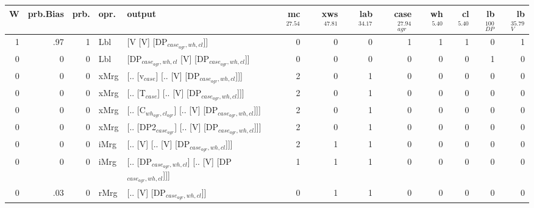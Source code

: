 \begin{tabularx}{\linewidth}{rrrlXrrrrrrrr}
\hline
   W &   prb.Bias &   prb. & opr.   & output                                                &   mc$^{27.54}$ &   xws$^{47.81}$ &   lab$^{34.17}$ &   case$_{agr}^{27.94}$ &   wh$^{5.40}$ &   cl$^{5.40}$ &   lb$_{DP}^{100}$ &   lb$_{V}^{35.79}$ \\
\hline
   1 &       .97 &   1 & Lbl  & [V [V] [DP$_{case_{agr},wh,cl}$]]                           &            0 &             0 &             0 &                  1 &           1 &           1 &                0 &              1 \\
   0 &       0 &   0 & Lbl  & [DP$_{case_{agr},wh,cl}$ [V] [DP$_{case_{agr},wh,cl}$]]           &            0 &             0 &             0 &                  0 &           0 &           0 &                1 &              0 \\
   0 &       0 &   0 & xMrg & [.. [v$_{case}$] [.. [V] [DP$_{case_{agr},wh,cl}$]]]            &            2 &             0 &             1 &                  0 &           0 &           0 &                0 &              0 \\
   0 &       0 &   0 & xMrg & [.. [T$_{case}$] [.. [V] [DP$_{case_{agr},wh,cl}$]]]            &            2 &             0 &             1 &                  0 &           0 &           0 &                0 &              0 \\
   0 &       0 &   0 & xMrg & [.. [C$_{wh_{agr},cl_{agr}}$] [.. [V] [DP$_{case_{agr},wh,cl}$]]]   &            2 &             0 &             1 &                  0 &           0 &           0 &                0 &              0 \\
   0 &       0 &   0 & xMrg & [.. [DP2$_{case_{agr}}$] [.. [V] [DP$_{case_{agr},wh,cl}$]]]      &            2 &             0 &             1 &                  0 &           0 &           0 &                0 &              0 \\
   0 &       0 &   0 & iMrg & [.. [V] [.. [V] [DP$_{case_{agr},wh,cl}$]]]                 &            2 &             1 &             1 &                  0 &           0 &           0 &                0 &              0 \\
   0 &       0 &   0 & iMrg & [.. [DP$_{case_{agr},wh,cl}$] [.. [V] [DP$_{case_{agr},wh,cl}$]]] &            1 &             1 &             1 &                  0 &           0 &           0 &                0 &              0 \\
   0 &       .03 &   0 & rMrg & [.. [V] [DP$_{case_{agr},wh,cl}$]]                          &            0 &             1 &             1 &                  0 &           0 &           0 &                0 &              0 \\
\hline
\end{tabularx}\endgroup\\
